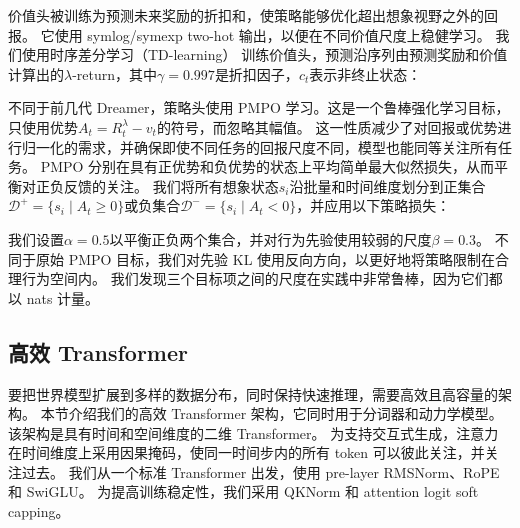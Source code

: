 \documentclass[11pt]{article}
\begin{document}
价值头被训练为预测未来奖励的折扣和，使策略能够优化超出想象视野之外的回报。
它使用 symlog/symexp two-hot 输出，以便在不同价值尺度上稳健学习\citep{dreamerv3}。
我们使用时序差分学习（TD-learning）\citep{sutton1988td} 训练价值头，预测沿序列由预测奖励和价值计算出的$\lambda$-return，其中$\gamma=0.997$是折扣因子，$c_t$表示非终止状态：


不同于前几代 Dreamer，策略头使用 PMPO\citep{abdolmaleki2024pmpo} 学习。这是一个鲁棒强化学习目标，只使用优势$A_t = R^\lambda_t-v_t$的符号，而忽略其幅值。
这一性质减少了对回报或优势进行归一化的需求，并确保即使不同任务的回报尺度不同，模型也能同等关注所有任务。
PMPO 分别在具有正优势和负优势的状态上平均简单最大似然损失，从而平衡对正负反馈的关注。
我们将所有想象状态$s_i$沿批量和时间维度划分到正集合$\mathcal{D}^+=\{s_i \mid A_t \geq 0\}$或负集合$\mathcal{D}^-=\{s_i \mid A_t < 0\}$，并应用以下策略损失：


我们设置$\alpha=0.5$以平衡正负两个集合，并对行为先验使用较弱的尺度$\beta=0.3$。
不同于原始 PMPO 目标，我们对先验 KL 使用反向方向，以更好地将策略限制在合理行为空间内。
我们发现三个目标项之间的尺度在实践中非常鲁棒，因为它们都以 nats 计量\citep{shannon1948infotheory}。

\subsection{高效 Transformer}

要把世界模型扩展到多样的数据分布，同时保持快速推理，需要高效且高容量的架构。
本节介绍我们的高效 Transformer 架构，它同时用于分词器和动力学模型。
该架构是具有时间和空间维度的二维 Transformer\citep{vaswani2017transformer}。
为支持交互式生成，注意力在时间维度上采用因果掩码，使同一时间步内的所有 token 可以彼此关注，并关注过去。
我们从一个标准 Transformer 出发，使用 pre-layer RMSNorm\citep{rmsnorm}、RoPE\citep{rope} 和 SwiGLU\citep{swiglu}。
为提高训练稳定性，我们采用 QKNorm\citep{dehghani2023scaling} 和 attention logit soft capping\citep{bello2016neural,gemma2}。
\end{document}
